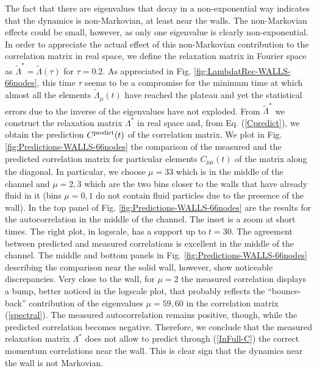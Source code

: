 \documentclass[a4paper,openright,12pt]{book}
\begin{document}
The fact  that there are  eigenvalues that decay in  a non-exponential
way indicates  that the dynamics  is non-Markovian, at least  near the
walls. The non-Markovian effects could  be small, however, as only one
eigenvalue  is clearly  non-exponential.  In  order to  appreciate the
actual effect  of this  non-Markovian contribution to  the correlation
matrix in real space, we define the relaxation matrix in Fourier space
as   $\tilde{\Lambda}^*=\tilde{\Lambda}(\tau)$  for   $\tau=0.2$.   As
appreciated in Fig.   \ref{fig:LambdatRec-WALLS-66nodes}, this time
$\tau$ seems to  be a compromise for the minimum  time at which almost
all the elements $\tilde{\Lambda}_\mu(t)$ have reached the plateau and
yet the statistical errors due to  the inverse of the eigenvalues have
not exploded.   From $\tilde{\Lambda}^*$  we construct  the relaxation
matrix $\Lambda^*$ in  real space and, from  Eq.  (\ref{Cpredict}), we
obtain the prediction $C^{\rm  predict}(t)$ of the correlation matrix.
We plot in Fig. \ref{fig:Predictions-WALLS-66nodes} the  comparison of the measured and the
predicted correlation matrix  for particular elements $C_{\mu\mu}(t)$
of the matrix  along the diagonal.  In particular,  we choose $\mu=33$
which is in the middle of the  channel and $\mu=2,3$ which are the two
bins closer to the walls that have already fluid in it (bins $\mu=0,1$
do not contain  fluid particles due to the presence  of the wall).  In
the  top  panel  of  Fig.   \ref{fig:Predictions-WALLS-66nodes} are  the  results  for  the
autocorrelation in the middle of  the channel. The inset is a zoom at short times. The right plot, in logscale,
has  a support  up  to  $t=30$. The  agreement  between predicted  and
measured correlations is excellent in  the middle of the channel.  The
middle  and  bottom  panels  in Fig.   \ref{fig:Predictions-WALLS-66nodes}  describing  the
comparison   near   the   solid   wall,   however,   show   noticeable
discrepancies.   Very close  to  the wall,  for  $\mu=2$ the  measured
correlation displays  a bump,  better noticed  in the  logscale plot,
that  probably  reflects  the   ``bounce-back''  contribution  of  the
eigenvalues  $\mu=59,60$ in  the correlation  matrix (\ref{spectral}).
The  measured  autocorrelation  remains positive,  though,  while  the
predicted correlation  becomes negative.  Therefore, we  conclude that
the measured relaxation  matrix $\Lambda^*$ does not  allow to predict
through (\ref{InFull-C})  the correct  momentum correlations  near the
wall.   This is  clear sign  that the  dynamics near  the wall  is not
Markovian.
\end{document}
